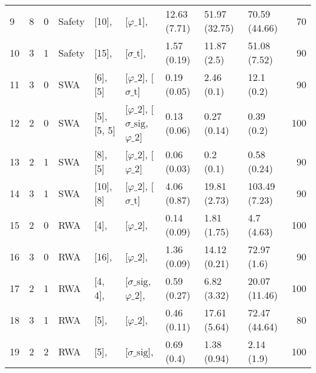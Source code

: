\begin{tabular}{lrrllllllr}
    9  & 8     & 0     & Safety      & [10],          & [$\varphi\_{1}$],                                                                    & 12.63 (7.71)                & 51.97 (32.75)   & 70.59 (44.66)  & 70  \\
    10 & 3     & 1     & Safety      & [15],          & [$\sigma\_{\mathrm{t}}$],                                                            & 1.57 (0.19)                 & 11.87 (2.5)     & 51.08 (7.52)   & 90  \\
    11 & 3     & 0     & SWA         & [6], [5]       & [$\varphi\_{2}$], [$\sigma\_{\mathrm{t}}$]                                           & 0.19 (0.05)                 & 2.46 (0.1)      & 12.1 (0.2)     & 90  \\
    12 & 2     & 0     & SWA         & [5], [5, 5]    & [$\varphi\_{2}$], [$\sigma\_{\mathrm{sig}}$,$\varphi\_{2}$]                          & 0.13 (0.06)                 & 0.27 (0.14)     & 0.39 (0.2)     & 100 \\
    13 & 2     & 1     & SWA         & [8], [5]       & [$\varphi\_{2}$], [$\varphi\_{2}$]                                                   & 0.06 (0.03)                 & 0.2 (0.1)       & 0.58 (0.24)    & 90  \\
    14 & 3     & 1     & SWA         & [10], [8]      & [$\varphi\_{2}$], [$\sigma\_{\mathrm{t}}$]                                           & 4.06 (0.87)                 & 19.81 (2.73)    & 103.49 (7.23)  & 90  \\
    15 & 2     & 0     & RWA         & [4],           & [$\varphi\_{2}$],                                                                    & 0.14 (0.09)                 & 1.81 (1.75)     & 4.7 (4.63)     & 100 \\
    16 & 3     & 0     & RWA         & [16],          & [$\varphi\_{2}$],                                                                    & 1.36 (0.09)                 & 14.12 (0.21)    & 72.97 (1.6)    & 90  \\
    17 & 2     & 1     & RWA         & [4, 4],        & [$\sigma\_{\mathrm{sig}}$,$\varphi\_{2}$],                                           & 0.59 (0.27)                 & 6.82 (3.32)     & 20.07 (11.46)  & 100 \\
    18 & 3     & 1     & RWA         & [5],           & [$\varphi\_{2}$],                                                                    & 0.46 (0.11)                 & 17.61 (5.64)    & 72.47 (44.64)  & 80  \\
    19 & 2     & 2     & RWA         & [5],           & [$\sigma\_{\mathrm{sig}}$],                                                          & 0.69 (0.4)                  & 1.38 (0.94)     & 2.14 (1.9)     & 100 \\

\end{tabular}
